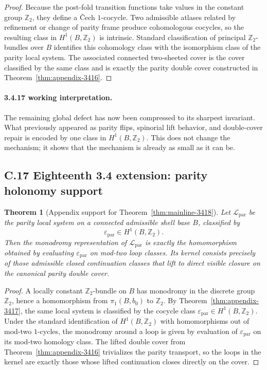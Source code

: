 \documentclass[12pt,a4paper]{article}
\newtheorem{theorem}{Theorem}[section]
\begin{document}
\begin{proof}
Because the post-fold transition functions take values in the constant group $\mathbb Z_2$, they define a \v{C}ech $1$-cocycle. Two admissible atlases related by refinement or change of parity frame produce cohomologous cocycles, so the resulting class in $H^1(B,\mathbb Z_2)$ is intrinsic. Standard classification of principal $\mathbb Z_2$-bundles over $B$ identifies this cohomology class with the isomorphism class of the parity local system. The associated connected two-sheeted cover is the cover classified by the same class and is exactly the parity double cover constructed in Theorem~\ref{thm:appendix-3416}.
\end{proof}

\paragraph{3.4.17 working interpretation.}
The remaining global defect has now been compressed to its sharpest invariant. What previously appeared as parity flips, spinorial lift behavior, and double-cover repair is encoded by one class in $H^1(B,\mathbb Z_2)$. This does not change the mechanism; it shows that the mechanism is already as small as it can be.


\subsection*{C.17 Eighteenth 3.4 extension: parity holonomy support}

\begin{theorem}[Appendix support for Theorem~\ref{thm:mainline-3418}]
\label{thm:appendix-3418}
Let $\mathcal L_{\mathrm{par}}$ be the parity local system on a connected admissible shell base $B$, classified by
\[
 \varepsilon_{\mathrm{par}}\in H^1(B,\mathbb Z_2).
\]
Then the monodromy representation of $\mathcal L_{\mathrm{par}}$ is exactly the homomorphism obtained by evaluating $\varepsilon_{\mathrm{par}}$ on mod-two loop classes. Its kernel consists precisely of those admissible closed continuation classes that lift to direct visible closure on the canonical parity double cover.
\end{theorem}

\begin{proof}
A locally constant $\mathbb Z_2$-bundle on $B$ has monodromy in the discrete group $\mathbb Z_2$, hence a homomorphism from $\pi_1(B,b_0)$ to $\mathbb Z_2$. By Theorem~\ref{thm:appendix-3417}, the same local system is classified by the cocycle class $\varepsilon_{\mathrm{par}}\in H^1(B,\mathbb Z_2)$. Under the standard identification of $H^1(B,\mathbb Z_2)$ with homomorphisms out of mod-two $1$-cycles, the monodromy around a loop is given by evaluation of $\varepsilon_{\mathrm{par}}$ on its mod-two homology class. The lifted double cover from Theorem~\ref{thm:appendix-3416} trivializes the parity transport, so the loops in the kernel are exactly those whose lifted continuation closes directly on the cover.
\end{proof}
\end{document}
